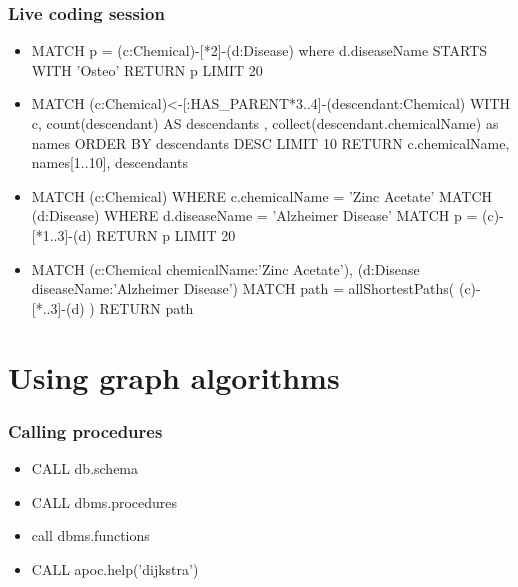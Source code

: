 \documentclass[12pt]{beamer}
\begin{document}
    \begin{frame}
        \frametitle{Live coding session}
        \begin{itemize}
            \item MATCH p = (c:Chemical)-[*2]-(d:Disease) where d.diseaseName STARTS WITH 'Osteo' RETURN p LIMIT 20
            \item MATCH (c:Chemical)<-[:HAS\_PARENT*3..4]-(descendant:Chemical) 
            WITH c, count(descendant) AS descendants , collect(descendant.chemicalName) as names ORDER BY descendants DESC LIMIT 10
            RETURN c.chemicalName, names[1..10], descendants
            \item MATCH (c:Chemical) WHERE c.chemicalName = 'Zinc Acetate'
            MATCH (d:Disease) WHERE d.diseaseName = 'Alzheimer Disease' 
            MATCH p = (c)-[*1..3]-(d)
            RETURN p LIMIT 20
            \item MATCH (c:Chemical {chemicalName:'Zinc Acetate'}), (d:Disease {diseaseName:'Alzheimer Disease'})
            MATCH path = allShortestPaths( (c)-[*..3]-(d) )
            RETURN path
        \end{itemize}
    \end{frame}
    
    \section{Using graph algorithms}
    \begin{frame}
        \frametitle{Calling procedures}
        \begin{itemize}
            \item CALL db.schema
            \item CALL dbms.procedures
            \item call dbms.functions
            \item CALL apoc.help('dijkstra')
        \end{itemize}
    \end{frame}
    
\end{document}
